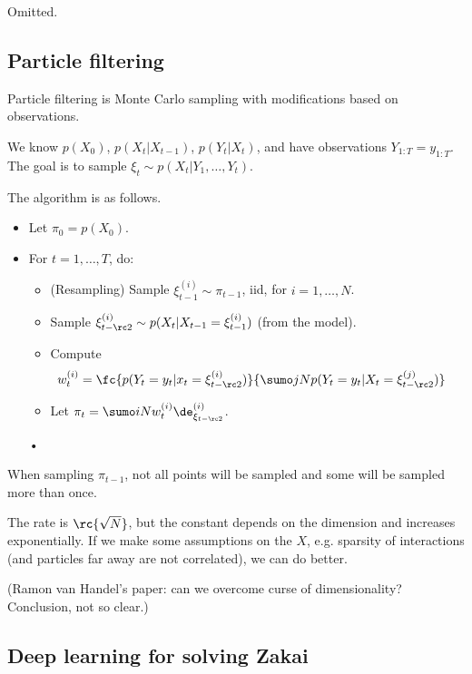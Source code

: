 Omitted.

\subsection{Particle filtering}

Particle filtering is Monte Carlo sampling with modifications based on observations.

We know $p(X_0)$, $p(X_t|X_{t-1})$, $p(Y_t|X_t)$, and have observations $Y_{1:T}=y_{1:T}$.
The goal is to sample $\xi_t\sim p(X_t|Y_1,\ldots, Y_t)$. %

The algorithm is as follows.
\begin{alg}
\begin{itemize}
\item
Let $\pi_0=p(X_0)$. 
\item
For $t=1,\ldots, T$, do:
\begin{itemize}
\item
(Resampling)
Sample $\xi_{t-1}^{(i)} \sim \pi_{t-1}$, iid, for $i=1,\ldots, N$. 
\item
Sample $\xi_{t-\rc 2}^{(i)}\sim p(X_t|X_{t-1}=\xi_{t-1}^{(i)})$ (from the model). %
\item
Compute
\begin{align}
w_t^{(i)} &= \fc{p(Y_t=y_t|x_t=\xi_{t-\rc 2}^{(i)})}{\sumo jN p(Y_t=y_t|X_t=\xi_{t-\rc 2}^{(j)})}
\end{align}
\item
Let $\pi_t = \sumo iN w_t^{(i)} \de_{\xi_{t-\rc 2}}^{(i)}$.
\end{itemize}•
\end{itemize}
\end{alg}
When sampling $\pi_{t-1}$, not all points will be sampled and some will be sampled more than once. 

The rate is $\rc{\sqrt N}$, but the constant depends on the dimension and increases exponentially. If we make some assumptions on the $X$, e.g. sparsity of interactions (and particles far away are not correlated), %
we can do better.

(Ramon van Handel's paper: can we overcome curse of dimensionality?Conclusion, not so clear.)

\subsection{Deep learning for solving Zakai}

